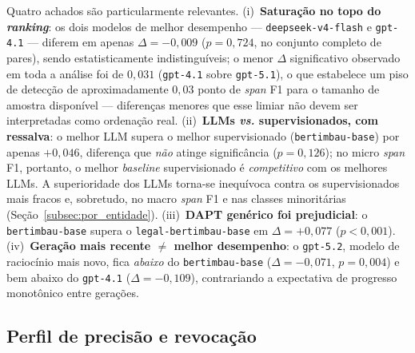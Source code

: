 Quatro achados são particularmente relevantes. (i)~\textbf{Saturação no topo do \textit{ranking}}: os dois modelos de melhor desempenho --- \texttt{deepseek-v4-flash} e \texttt{gpt-4.1} --- diferem em apenas $\Delta = -0{,}009$ ($p = 0{,}724$, no conjunto completo de pares), sendo estatisticamente indistinguíveis; o menor $\Delta$ significativo observado em toda a análise foi de $0{,}031$ (\texttt{gpt-4.1} sobre \texttt{gpt-5.1}), o que estabelece um piso de detecção de aproximadamente $0{,}03$ ponto de \textit{span} F1 para o tamanho de amostra disponível --- diferenças menores que esse limiar não devem ser interpretadas como ordenação real. (ii)~\textbf{LLMs \textit{vs.} supervisionados, com ressalva}: o melhor LLM supera o melhor supervisionado (\texttt{bertimbau-base}) por apenas $+0{,}046$, diferença que \emph{não} atinge significância ($p = 0{,}126$); no micro \textit{span} F1, portanto, o melhor \textit{baseline} supervisionado é \emph{competitivo} com os melhores LLMs. A superioridade dos LLMs torna-se inequívoca contra os supervisionados mais fracos e, sobretudo, no macro \textit{span} F1 e nas classes minoritárias (Seção~\ref{subsec:por_entidade}). (iii)~\textbf{DAPT genérico foi prejudicial}: o \texttt{bertimbau-base} supera o \texttt{legal-bertimbau-base} em $\Delta = +0{,}077$ ($p < 0{,}001$). (iv)~\textbf{Geração mais recente $\neq$ melhor desempenho}: o \texttt{gpt-5.2}, modelo de raciocínio mais novo, fica \emph{abaixo} do \texttt{bertimbau-base} ($\Delta = -0{,}071$, $p = 0{,}004$) e bem abaixo do \texttt{gpt-4.1} ($\Delta = -0{,}109$), contrariando a expectativa de progresso monotônico entre gerações.

\subsection{Perfil de precisão e revocação}
\label{subsec:perfil_pr}

